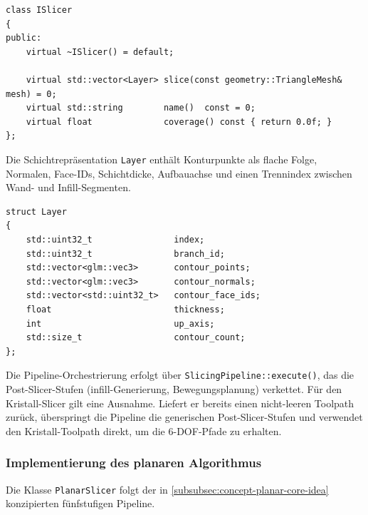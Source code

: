                 \begin{lstlisting}[style=cppStyle, caption={Strategie-Interface \texttt{ISlicer}.}, label={lst:impl-medusa-islicer}]
class ISlicer
{
public:
    virtual ~ISlicer() = default;

    virtual std::vector<Layer> slice(const geometry::TriangleMesh& mesh) = 0;
    virtual std::string        name()  const = 0;
    virtual float              coverage() const { return 0.0f; }
};
                \end{lstlisting}

                Die Schichtrepräsentation \texttt{Layer} enthält Konturpunkte als flache Folge, Normalen, Face-IDs, Schichtdicke, Aufbauachse und einen Trennindex zwischen Wand- und Infill-Segmenten.

                \begin{lstlisting}[style=cppStyle, caption={Schichtrepräsentation \texttt{Layer}.}, label={lst:impl-medusa-layer}]
struct Layer
{
    std::uint32_t                index;
    std::uint32_t                branch_id;
    std::vector<glm::vec3>       contour_points;
    std::vector<glm::vec3>       contour_normals;
    std::vector<std::uint32_t>   contour_face_ids;
    float                        thickness;
    int                          up_axis;
    std::size_t                  contour_count;
};
                \end{lstlisting}

                Die Pipeline-Orchestrierung erfolgt über \texttt{SlicingPipeline::execute()}, das die Post-Slicer-Stufen (\gls{infill}-Generierung, Bewegungsplanung) verkettet.
                Für den Kristall-Slicer gilt eine Ausnahme.
                Liefert er bereits einen nicht-leeren Toolpath zurück, überspringt die Pipeline die generischen Post-Slicer-Stufen und verwendet den Kristall-Toolpath direkt, um die 6-\ac{DOF}-Pfade zu erhalten.


            \subsubsection{Implementierung des planaren Algorithmus}\label{subsubsec:impl-planar-algorithm}
                Die Klasse \texttt{PlanarSlicer} folgt der in \cref{subsubsec:concept-planar-core-idea} konzipierten fünfstufigen Pipeline.

